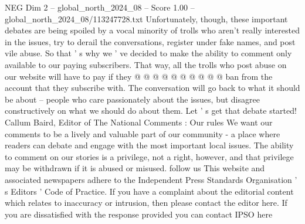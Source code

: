 \begin{textsample}{NEG Dim 2 – global\_north\_2024\_08 – Score 1.00 – global\_north\_2024\_08/113247728.txt}
Unfortunately, though, these important debates are being spoiled by a vocal minority of trolls who aren't really interested in the issues, try to derail the conversations, register under fake names, and post vile abuse.
So that ' s why we ' ve decided to make the ability to comment only available to our paying subscribers.
That way, all the trolls who post abuse on our website will have to pay if they @ @ @ @ @ @ @ @ @ @ ban from the account that they subscribe with.
The conversation will go back to what it should be about -- people who care passionately about the issues, but disagree constructively on what we should do about them.
Let ' s get that debate started!
Callum Baird, Editor of The National Comments : Our rules We want our comments to be a lively and valuable part of our community - a place where readers can debate and engage with the most important local issues.
The ability to comment on our stories is a privilege, not a right, however, and that privilege may be withdrawn if it is abused or misused. follow us This website and associated newspapers adhere to the Independent Press Standards Organisation ' s Editors ' Code of Practice.
If you have a complaint about the editorial content which relates to inaccuracy or intrusion, then please contact the editor here.
If you are dissatisfied with the response provided you can contact IPSO here

\end{textsample}
